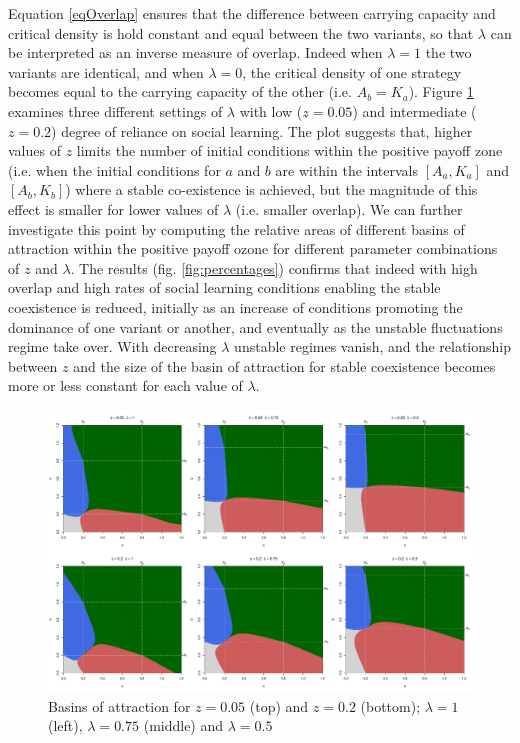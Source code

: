\documentclass[review,authoryear]{elsarticle}
\begin{document}
Equation \eqref{eqOverlap} ensures that the difference between carrying capacity and critical density is hold constant and equal between the two variants, so that $\lambda$ can be interpreted as an inverse  measure of overlap. Indeed when $\lambda=1$ the two variants are identical, and when $\lambda=0$, the critical density of one strategy becomes equal to the carrying capacity of the other (i.e. $A_b=K_a$). Figure \ref{fig:overlap} examines three different settings of $\lambda$  with low ($z=0.05$) and intermediate ($z=0.2$) degree of reliance on social learning. The plot suggests that, higher values of $z$ limits the number of initial conditions within the positive payoff zone (i.e. when the initial conditions for $a$ and $b$ are within the intervals $[A_a,K_a]$ and $[A_b,K_b]$) where a stable co-existence is achieved, but the magnitude of this effect is smaller for lower values of $\lambda$ (i.e. smaller overlap). We can further investigate this point by computing the relative areas of different basins of attraction within the positive payoff ozone for different parameter combinations of $z$ and $\lambda$. The results (fig. \ref{fig:percentages}) confirms that indeed with high overlap and high rates of social learning conditions enabling the stable coexistence is reduced, initially as an increase of conditions promoting the dominance of one variant or another, and eventually as the unstable fluctuations regime take over. With decreasing $\lambda$ unstable regimes vanish, and the relationship between $z$ and the size of the basin of attraction for stable coexistence becomes more or less constant for each value of $\lambda$. 

\begin{figure}
  \centering
      \includegraphics[width=\textwidth]{./figures/figure5}
  \caption{Basins of attraction for $z=0.05$ (top) and $z=0.2$ (bottom); $\lambda=1$ (left), $\lambda=0.75$ (middle) and $\lambda=0.5$}
    \label{fig:overlap}
\end{figure}
\end{document}
